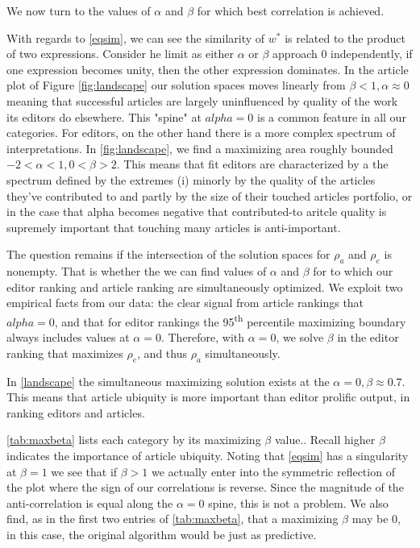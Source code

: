 We now turn to the values of $\alpha$ and $\beta$ for which best correlation is achieved.  

With regards to \eqref{eqsim}, we can see the similarity of $w^*$ is related to the product of two expressions. Consider he limit as either $\alpha$ or $\beta$ approach $0$ independently, if one expression becomes unity, then the other expression dominates. In the article plot of Figure \ref{fig:landscape} our solution spaces moves linearly from $ \beta < 1 , \alpha \approx 0$ meaning that successful articles are largely uninfluenced by quality of the work its editors do elsewhere. This "spine" at $alpha = 0$ is a common feature in all our categories.
 For editors, on the other hand there is a more complex spectrum of interpretations. In  \ref{fig:landscape}, we find a maximizing area roughly bounded $ -2  <\alpha < 1 , 0 < \beta > 2 $. This means that fit editors are characterized by a the spectrum defined by the extremes (i) minorly by the quality of the articles they've contributed to and partly by the size of their touched articles portfolio, or in the case that alpha becomes negative that contributed-to aritcle quality is supremely important that touching many articles is anti-important.

The question remains if the intersection of the solution spaces for $\rho_a$ and $\rho_e$ is nonempty. That is whether the we can find values of $\alpha$ and $\beta$ for to which our editor ranking and article ranking are simultaneously optimized. We exploit two empirical facts from our data: the clear signal from article rankings that $alpha = 0$, and that for editor rankings the 95\textsuperscript{th} percentile maximizing boundary always includes values at $\alpha = 0$. Therefore, with $\alpha = 0$, we solve $\beta$ in the editor ranking that maximizes $\rho_e$, and thus $\rho_a$ simultaneously. 

In \ref{landscape} the simultaneous maximizing solution exists at the $\alpha = 0, \beta \approx 0.7$. This means that article ubiquity is more important than editor prolific output, in ranking editors and articles.

\ref{tab:maxbeta} lists each category by its maximizing $\beta$ value.. Recall higher $\beta$ indicates the importance of article ubiquity. Noting that \eqref{eqsim} has a singularity at $\beta = 1$ we see that if $\beta > 1$ we actually enter into the symmetric reflection of the plot where the sign of our correlations is reverse. Since the magnitude of the anti-correlation is equal along the $\alpha = 0$ spine, this is not a problem.
We also find, as in the first two entries of \ref{tab:maxbeta}, that a maximizing $\beta$ may be $0$, in this case, the original \cite{hidalgo2009} algorithm would be just as predictive. 

